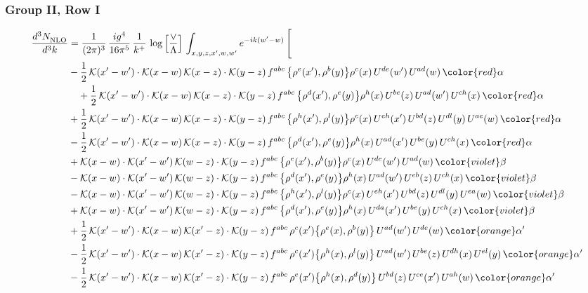 \subsubsection{Group II, Row I}
\begin{align}
     \frac{d^{3}N_{\rm NLO}^{\rm}}{d^{3}k}  & = \frac{1}{(2\pi)^{3}}\, \frac{ig^{4}}{16\pi^{5}}\, \frac{1}{k^{+}}\, \log{\left[\frac{\vee}{\Lambda}\right]}\, \int_{x,y,z,x^{\prime},w,w^{\prime}}e^{-ik(w^{\prime}-w)}\, \Bigg[\notag \\ & -\frac{1}{2}\,\mathcal{K}(x'-w')\cdot\mathcal{K}(x-w)\,\mathcal{K}(x-z)\cdot\mathcal{K}(y-z)\, f^{abc}\,\big\{\rho^{e}(x'),\rho^{b}(y)\big\}\rho^{c}(x)\,U^{de}(w')\,U^{ad}(w)\,{\color{red}\alpha}\notag \\ &\quad+\frac{1}{2}\,\mathcal{K}(x'-w')\cdot\mathcal{K}(x-w)\,\mathcal{K}(x-z)\cdot\mathcal{K}(y-z)\, f^{abc}\,\big\{\rho^{d}(x'),\rho^{e}(y)\big\}\rho^{h}(x)\,U^{be}(z)\,U^{ad}(w')\,U^{ch}(x)\,{\color{red}\alpha}\notag\\ & +\frac{1}{2}\,\mathcal{K}(x'-w')\cdot\mathcal{K}(x-w)\,\mathcal{K}(x-z)\cdot\mathcal{K}(y-z)\, f^{abc}\,\big\{\rho^{h}(x'),\rho^{l}(y)\big\}\rho^{c}(x)\,U^{eh}(x')\,U^{bd}(z)\,U^{dl}(y)\,U^{ae}(w)\,{\color{red}\alpha}\notag \\ &-\frac{1}{2}\,\mathcal{K}(x'-w')\cdot\mathcal{K}(x-w)\,\mathcal{K}(x-z)\cdot\mathcal{K}(y-z)\, f^{abc}\,\big\{\rho^{d}(x'),\rho^{e}(y)\big\}\rho^{h}(x)\,U^{ad}(x')\,U^{be}(y)\,U^{ch}(x)\,{\color{red}\alpha}\notag\\ &+\mathcal{K}(x-w)\cdot\mathcal{K}(x'-w')\,\mathcal{K}(w-z)\cdot\mathcal{K}(y-z)\, f^{abc}\,\big\{\rho^{e}(x'),\rho^{b}(y)\big\}\rho^{c}(x)\,U^{de}(w')\,U^{ad}(w)\,{\color{violet}\beta}\notag\\ &-\mathcal{K}(x-w)\cdot\mathcal{K}(x'-w')\,\mathcal{K}(w-z)\cdot\mathcal{K}(y-z)\, f^{abc}\,\big\{\rho^{d}(x'),\rho^{e}(y)\big\}\rho^{h}(x)\,U^{ad}(w')\,U^{eb}(z)\,U^{ch}(x)\,{\color{violet}\beta}\notag \\ &-\mathcal{K}(x-w)\cdot\mathcal{K}(x'-w')\,\mathcal{K}(w-z)\cdot\mathcal{K}(y-z)\, f^{abc}\,\big\{\rho^{h}(x'),\rho^{l}(y)\big\}\rho^{c}(x)\,U^{eh}(x')\,U^{bd}(z)\,U^{dl}(y)\,U^{ea}(w)\,{\color{violet}\beta}\notag \\ & +\mathcal{K}(x-w)\cdot\mathcal{K}(x'-w')\,\mathcal{K}(w-z)\cdot\mathcal{K}(y-z)\, f^{abc}\,\big\{\rho^{d}(x'),\rho^{e}(y)\big\}\rho^{h}(x)\,U^{da}(x')\,U^{be}(y)\,U^{ch}(x)\,{\color{violet}\beta}\notag \\ &+\frac{1}{2}\,\mathcal{K}(x'-w')\cdot\mathcal{K}(x-w)\,\mathcal{K}(x'-z)\cdot\mathcal{K}(y-z)\, f^{abc}\,\rho^{c}(x')\big\{\rho^{e}(x),\rho^{b}(y)\big\}\,U^{ad}(w')\,U^{de}(w)\,{\color{orange}\alpha'}\notag \\ &-\frac{1}{2}\,\mathcal{K}(x'-w')\cdot\mathcal{K}(x-w)\,\mathcal{K}(x'-z)\cdot\mathcal{K}(y-z)\, f^{abc}\,\rho^{c}(x')\big\{\rho^{h}(x),\rho^{l}(y)\big\}\,U^{ad}(w')\,U^{be}(z)\,U^{dh}(x)\,U^{el}(y)\,{\color{orange}\alpha'}\notag \\ &-\frac{1}{2}\,\mathcal{K}(x'-w')\cdot\mathcal{K}(x-w)\,\mathcal{K}(x'-z)\cdot\mathcal{K}(y-z)\, f^{abc}\,\rho^{e}(x')\big\{\rho^{h}(x),\rho^{d}(y)\big\}\,U^{bd}(z)\,U^{ce}(x')\,U^{ah}(w)\,{\color{orange}\alpha'}\notag \\ & 
\end{align}
